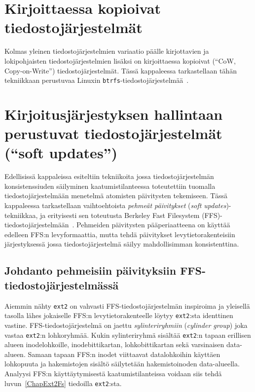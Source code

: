 \section{Kirjoittaessa kopioivat tiedostojärjestelmät}
\label{ChapCopyOnWrite}
Kolmas yleinen tiedostojärjestelmien variaatio päälle kirjottavien ja lokipohjaisten tiedostojärjestelmien lisäksi on kirjoittaessa kopioivat (``CoW, Copy-on-Write'') tiedostojärjestelmät.
Tässä kappaleessa tarkastellaan tähän tekniikkaan perustuvaa Linuxin \texttt{btrfs}-tiedostojärjestelmää~\cite{Btrfs}.

\section{Kirjoitusjärjestyksen hallintaan perustuvat tiedostojärjestelmät (``soft updates'')}
\label{ChapSoftUpdates}
Edellisissä kappaleissa esiteltiin tekniikoita jossa tiedostojärjestelmän konsistenssiuden säilyminen kaatumistilanteessa toteutettiin tuomalla tiedostojärjestelmään menetelmä atomisten päivitysten tekemiseen.
Tässä kappaleessa tarkastellaan vaihtoehtoista \emph{pehmeät päivitykset} (\emph{soft updates})-tekniikkaa,
ja erityisesti sen toteutusta Berkeley Fast Filesystem (FFS)-tiedostojärjestelmään~\cite{SoftUpdatesFfs}.
Pehmeiden päivitysten pääperiaatteena on käyttää edelleen FFS:n levyformaattia,
mutta tehdä päivitykset levytietorakenteisiin järjestyksessä jossa tiedostojärjestelmä säilyy mahdollisimman konsistenttina.

\subsection{Johdanto pehmeisiin päivityksiin FFS-tiedostojärjestelmässä}
Aiemmin nähty \texttt{ext2} on vahvasti FFS-tiedostojärjestelmän inspiroima
ja yleisellä tasolla lähes jokaiselle FFS:n levytietorakenteelle löytyy \texttt{ext2}:sta identtinen vastine.
FFS-tiedostojärjestelmä on jaettu \emph{sylinteriryhmiin} (\emph{cylinder group}) joka vastaa \texttt{ext2}:n lohkoryhmää.
Kukin sylinteriryhmä sisältää \texttt{ext2}:n tapaan erillisen alueen inodelohkoille, inodebittikartan, lohkobittikartan sekä varsinaisen data-alueen.
Samaan tapaan FFS:n inodet viittaavat datalohkoihin käyttäen lohkopuuta ja hakemistojen sisältö säilytetään hakemistoinoden data-alueella.
Analyysi FFS:n käyttäytymisestä kaatumistilanteissa voidaan siis tehdä luvun~\ref{ChapExt2Fs} tiedoilla \texttt{ext2}:sta.

